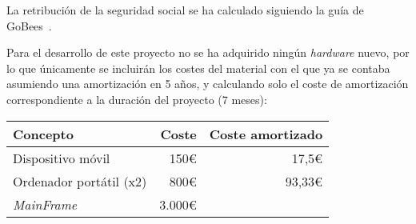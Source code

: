 La retribución de la seguridad social se ha calculado siguiendo la guía de GoBees~\cite{gobees}.

Para el desarrollo de este proyecto no se ha adquirido ningún \textit{hardware} nuevo, por lo que únicamente se incluirán los costes del material con el que ya se contaba asumiendo una amortización en 5 años, y calculando solo el coste de amortización correspondiente a la duración del proyecto (7 meses):

\begin{longtable}[]{@{}lrr@{}}
	\toprule
	\begin{minipage}[b]{0.29\columnwidth}\raggedright\strut
		\textbf{Concepto}\strut
	\end{minipage} & \begin{minipage}[b]{0.18\columnwidth}\raggedright\strut
		\textbf{Coste}\strut
	\end{minipage} & \begin{minipage}[b]{0.32\columnwidth}\raggedright\strut
		\textbf{Coste amortizado}\strut
	\end{minipage}\tabularnewline
	\midrule
	\endhead
	\begin{minipage}[t]{0.29\columnwidth}\raggedright\strut
		Dispositivo móvil\strut
	\end{minipage} & \begin{minipage}[t]{0.18\columnwidth}\raggedright\strut
		150\euro{}\strut
	\end{minipage} & \begin{minipage}[t]{0.32\columnwidth}\raggedright\strut
		17,5\euro{}\strut
	\end{minipage}\tabularnewline
	\begin{minipage}[t]{0.29\columnwidth}\raggedright\strut
		Ordenador portátil (x2)\strut
	\end{minipage} & \begin{minipage}[t]{0.18\columnwidth}\raggedright\strut
		800\euro{}\strut
	\end{minipage} & \begin{minipage}[t]{0.32\columnwidth}\raggedright\strut
		93,33\euro{}\strut
	\end{minipage}\tabularnewline
	\begin{minipage}[t]{0.29\columnwidth}\raggedright\strut
		\textit{MainFrame}\strut
	\end{minipage} & \begin{minipage}[t]{0.18\columnwidth}\raggedright\strut
		3.000\euro{}\strut
	\end{minipage} & \begin{minipage}[t]{0.32\columnwidth}\raggedright\strut

\end{minipage}
\end{longtable}
